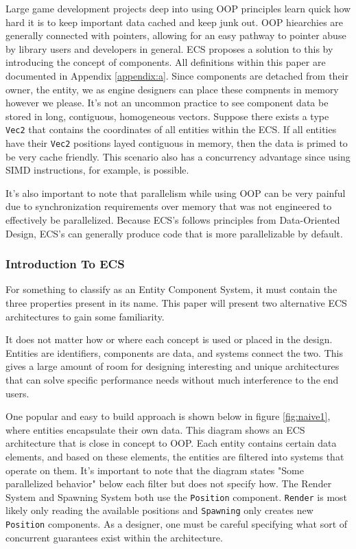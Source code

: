Large game development projects deep into using OOP principles learn quick how hard it is to keep important data cached and keep junk out. OOP hiearchies are generally connected with pointers, allowing for an easy pathway to pointer abuse by library users and developers in general. ECS proposes a solution to this by introducing the concept of components. All definitions within this paper are documented in Appendix \ref{appendix:a}. Since components are detached from their owner, the entity, we as engine designers can place these compnents in memory however we please. It's not an uncommon practice to see component data be stored in long, contiguous, homogeneous vectors. Suppose there exists a type \texttt{Vec2} that contains the coordinates of all entities within the ECS. If all entities have their \texttt{Vec2} positions layed contiguous in memory, then the data is primed to be very cache friendly. \cite{Wiebusch2012}\cite{SanderMertensECS} This scenario also has a concurrency advantage since using SIMD instructions, for example, is possible. 

It's also important to note that parallelism while using OOP can be very painful due to synchronization requirements over memory that was not engineered to effectively be parallelized. Because ECS's follows principles from Data-Oriented Design, ECS's can generally produce code that is more parallelizable by default.\cite{RomeoPHD}

\subsubsection{Introduction To ECS}
For something to classify as an Entity Component System, it must contain the three properties present in its name. This paper will present two alternative ECS architectures to gain some familiarity. 

It does not matter how or where each concept is used or placed in the design. Entities are identifiers, components are data, and systems connect the two. This gives a large amount of room for designing interesting and unique architectures that can solve specific performance needs without much interference to the end users. 

One popular and easy to build approach is shown below in figure \ref{fig:naive1}, where entities encapsulate their own data. This diagram shows an ECS architecture that is close in concept to OOP. Each entity contains certain data elements, and based on these elements, the entities are filtered into systems that operate on them. It's important to note that the diagram states "Some parallelized behavior" below each filter but does not specify how. The Render System and Spawning System both use the \texttt{Position} component. \texttt{Render} is most likely only reading the available positions and \texttt{Spawning} only creates new \texttt{Position} components. As a designer, one must be careful specifying what sort of concurrent guarantees exist within the architecture. 

